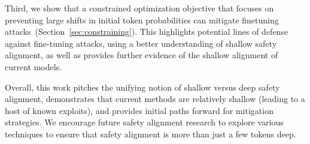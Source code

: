 Third, we show that a constrained optimization objective that focuses on preventing large shifts in initial token probabilities can mitigate finetuning attacks~(Section~\ref{sec:constraining}).
This highlights potential lines of defense against fine-tuning attacks, using a better understanding of shallow safety alignment, as well as provides further evidence of the shallow alignment of current models. 

Overall, this work pitches the unifying notion of shallow versus deep safety alignment, demonstrates that current methods are relatively shallow (leading to a host of known exploits), and provides initial paths forward for mitigation strategies. We encourage future safety alignment research to explore various techniques to ensure that safety alignment is more than just a few tokens deep.


